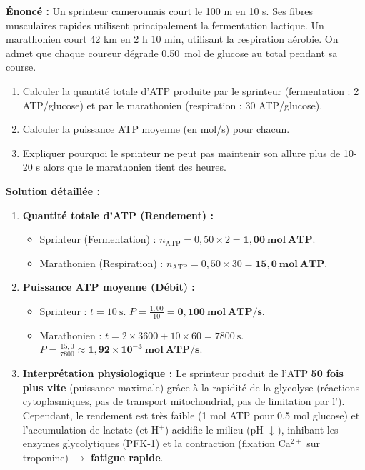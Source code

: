 \documentclass[11pt]{article}
\begin{document}
\begin{exoresolu}
    \textbf{Énoncé :} Un sprinteur camerounais court le 100 m en 10 s. Ses fibres musculaires rapides utilisent principalement la fermentation lactique. Un marathonien court 42 km en 2 h 10 min, utilisant la respiration aérobie. On admet que chaque coureur dégrade \SI{0,50}{mol} de glucose au total pendant sa course.
    \begin{enumerate}
        \item Calculer la quantité totale d'ATP produite par le sprinteur (fermentation : 2 ATP/glucose) et par le marathonien (respiration : 30 ATP/glucose).
        \item Calculer la puissance ATP moyenne (en mol/s) pour chacun.
        \item Expliquer pourquoi le sprinteur ne peut pas maintenir son allure plus de 10-20 s alors que le marathonien tient des heures.
    \end{enumerate}
    \tcblower
    \textbf{Solution détaillée :}
    \begin{enumerate}
        \item \textbf{Quantité totale d'ATP (Rendement) :}
              \begin{itemize}
                  \item Sprinteur (Fermentation) : $n_{\text{ATP}} = 0,50 \times 2 = \mathbf{1,00\ mol\ ATP}$.
                  \item Marathonien (Respiration) : $n_{\text{ATP}} = 0,50 \times 30 = \mathbf{15,0\ mol\ ATP}$.
              \end{itemize}
        \item \textbf{Puissance ATP moyenne (Débit) :}
              \begin{itemize}
                  \item Sprinteur : $t = 10\ \text{s}$. $P = \frac{1,00}{10} = \mathbf{0,100\ mol\ ATP/s}$.
                  \item Marathonien : $t = 2 \times 3600 + 10 \times 60 = 7800\ \text{s}$. $P = \frac{15,0}{7800} \approx \mathbf{1,92 \times 10^{-3}\ mol\ ATP/s}$.
              \end{itemize}
        \item \textbf{Interprétation physiologique :}
              Le sprinteur produit de l'ATP \textbf{50 fois plus vite} (puissance maximale) grâce à la rapidité de la glycolyse (réactions cytoplasmiques, pas de transport mitochondrial, pas de limitation par l'). Cependant, le rendement est très faible (1 mol ATP pour 0,5 mol glucose) et l'accumulation de lactate (et H$^+$) acidifie le milieu (pH $\downarrow$), inhibant les enzymes glycolytiques (PFK-1) et la contraction (fixation Ca$^{2+}$ sur troponine) $\to$ \textbf{fatigue rapide}.

\end{enumerate}
\end{exoresolu}
\end{document}
